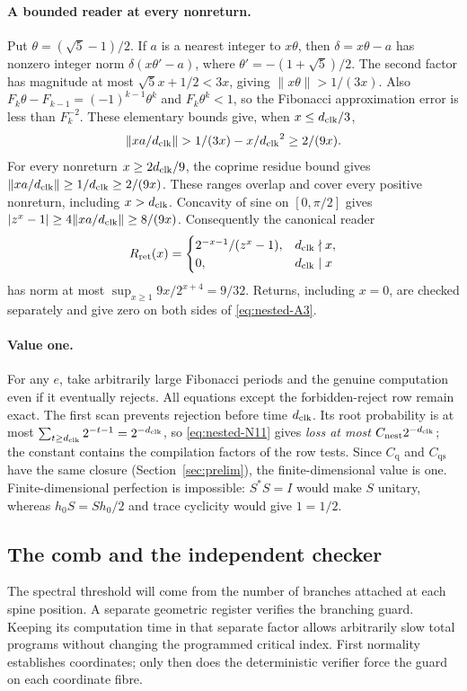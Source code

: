 \paragraph{A bounded reader at every nonreturn.}
Put $\theta=(\sqrt5-1)/2$. If $a$ is a nearest integer to $x\theta$,
then $\delta=x\theta-a$ has nonzero integer norm
$\delta(x\theta'-a)$, where $\theta'=-(1+\sqrt5)/2$.
The second factor has magnitude at most $\sqrt5x+1/2<3x$, giving
$\|x\theta\|>1/(3x)$. Also
$F_k\theta-F_{k-1}=(-1)^{k-1}\theta^k$ and $F_k\theta^k<1$,
so the Fibonacci approximation error is less than $F_k^{-2}$.
These elementary bounds
give, when
$x\le {d_{\rm clk}}/3$,
\[
 \|xa/{d_{\rm clk}}\|>1/(3x)-x/{d_{\rm clk}}^2\ge2/(9x).
\]
For every nonreturn $x\ge2{d_{\rm clk}}/9$, the coprime residue bound gives
$\|xa/{d_{\rm clk}}\|\ge1/{d_{\rm clk}}\ge2/(9x)$. These ranges overlap and cover every
positive nonreturn, including $x>{d_{\rm clk}}$. Concavity of sine on
$[0,\pi/2]$ gives $|z^x-1|\ge4\|xa/{d_{\rm clk}}\|\ge8/(9x)$.
Consequently the canonical reader
\[
 R_{\rm ret}(x)=\begin{cases}2^{-x-1}/(z^x-1),&{d_{\rm clk}}\nmid x,\\0,&{d_{\rm clk}}\mid x\end{cases}
\]
has norm at most $\sup_{x\ge1}9x/2^{x+4}=9/32$. Returns, including
$x=0$, are checked separately and give zero on both sides of \eqref{eq:nested-A3}.

\paragraph{Value one.}
For any $e$, take arbitrarily large Fibonacci periods and the genuine
computation even if it eventually rejects. All equations except the
forbidden-reject row remain exact. The first scan prevents rejection
before time ${d_{\rm clk}}$. Its root probability is at most
$\sum_{t\ge {d_{\rm clk}}}2^{-t-1}=2^{-{d_{\rm clk}}}$, so \eqref{eq:nested-N11} gives
\emph{loss at most $C_{\rm nest}2^{-{d_{\rm clk}}}$}; the constant contains the compilation factors of the row tests. Since $C_{\mathrm{q}}$ and $C_{\mathrm{qs}}$ have the same closure (Section~\ref{sec:prelim}), the finite-dimensional value is one. Finite-dimensional perfection is impossible: $S^*S=I$
would make $S$ unitary, whereas $h_0S=S h_0/2$ and trace cyclicity
would give $1=1/2$.

\subsection{The comb and the independent checker}
The spectral threshold will come from the number of branches attached
at each spine position. A separate geometric register verifies the
branching guard. Keeping its computation time in that separate factor
allows arbitrarily slow total programs without changing the programmed
critical index. First normality establishes coordinates; only then does
the deterministic verifier force the guard on each coordinate fibre.

